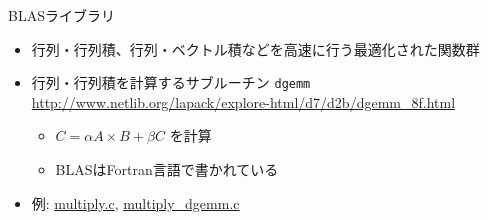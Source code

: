 \begin{frame}[t,fragile]{BLASライブラリ}
  \begin{itemize}
  \item 行列・行列積、行列・ベクトル積などを高速に行う最適化された関数群
  \item 行列・行列積を計算するサブルーチン {\tt dgemm} \\
    \url{http://www.netlib.org/lapack/explore-html/d7/d2b/dgemm_8f.html}
    \begin{itemize}
    \item $C = \alpha A \times B + \beta C$ を計算
    \item BLASはFortran言語で書かれている
    \end{itemize}
  \item 例: \href{https://github.com/todo-group/computer-experiments/blob/master/exercise/matrix/multiply.c}{multiply.c}, \href{https://github.com/todo-group/computer-experiments/blob/master/exercise/matrix/multiply_dgemm.c}{multiply\_dgemm.c}
  \end{itemize}
\end{frame}

